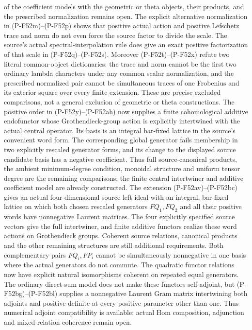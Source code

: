 \begin{description}
of the coefficient models with the geometric or theta objects,
their products, and the prescribed normalization remains open.
The explicit alternative normalization in (P-F52m)--(P-F52p)
shows that positive actual action and positive Lefschetz trace
and norm do not even force the source factor to divide the scale.
The source's actual spectral-interpolation rule does give an
exact positive factorization of that scale in (P-F52q)--(P-F52s).
Moreover (P-F52t)--(P-F52x) refute two literal common-object
dictionaries: the trace and norm cannot be the first two ordinary
lambda characters under any common scalar normalization, and
the prescribed normalized pair cannot be simultaneous traces of
one Frobenius and its exterior square over every finite extension.
These are precise excluded comparisons, not a general exclusion
of geometric or theta constructions.
The positive order in (P-F52y)--(P-F52ah) now supplies a finite
cohomological additive endofunctor whose Grothendieck-group action
is explicitly intertwined with the actual central operator.
Its basis is an integral bar-fixed lattice in the source's
convenient word form. The corresponding global generator fails
membership in two explicitly rescaled generator forms, and its
change to the displayed source candidate basis has a negative
coefficient. Thus full source-canonical products, the ambient
minimum-degree condition, monoidal structure and uniform tensor
degree are the remaining comparisons; the finite central
intertwiner and additive coefficient model are already constructed.
The extension (P-F52av)--(P-F52bc) gives an actual
four-dimensional source left ideal with an integral, bar-fixed
lattice on which both chosen rescaled generators $FQ_1,FQ_2$
and all their positive words have nonnegative Laurent matrices.
The four explicitly specified source vectors give the full
intertwiner, and finite additive functors realize these word
actions on Grothendieck groups. Coherent source relations,
canonical products and the other remaining structures are
still additional requirements. Both complementary pairs
$FQ_i,FP_i$ cannot be simultaneously nonnegative in one
basis where the actual generators do not commute.
The quadratic functor relations now have explicit natural
isomorphisms coherent on repeated equal generators.
The ordinary direct-sum model does not make these functors
self-adjoint, but (P-F52bg)--(P-F52bl) supplies a nonnegative
Laurent Gram matrix intertwining both adjoints and positive
definite at every positive parameter other than one. Thus
numerical adjoint compatibility is available; actual Hom
composition, adjunction and mixed-relation coherence remain open.


\end{description}
